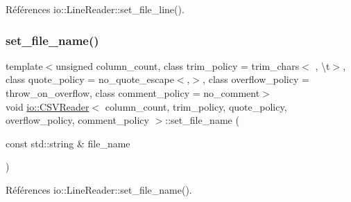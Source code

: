 Références io\+::\+Line\+Reader\+::set\+\_\+file\+\_\+line().

\mbox{\label{classio_1_1CSVReader_a4096c1e43a4fba2b4f5ae21d047b5fbc}} 
\subsubsection{\texorpdfstring{set\+\_\+file\+\_\+name()}{set\_file\_name()}\hspace{0.1cm}{\footnotesize\ttfamily [1/2]}}
{\footnotesize\ttfamily template$<$unsigned column\+\_\+count, class trim\+\_\+policy  = trim\+\_\+chars$<$\textquotesingle{} \textquotesingle{}, \textquotesingle{}\textbackslash{}t\textquotesingle{}$>$, class quote\+\_\+policy  = no\+\_\+quote\+\_\+escape$<$\textquotesingle{},\textquotesingle{}$>$, class overflow\+\_\+policy  = throw\+\_\+on\+\_\+overflow, class comment\+\_\+policy  = no\+\_\+comment$>$ \\
void \hyperlink{classio_1_1CSVReader}{io\+::\+C\+S\+V\+Reader}$<$ column\+\_\+count, trim\+\_\+policy, quote\+\_\+policy, overflow\+\_\+policy, comment\+\_\+policy $>$\+::set\+\_\+file\+\_\+name (\begin{DoxyParamCaption}\item[{const std\+::string \&}]{file\+\_\+name }\end{DoxyParamCaption})\hspace{0.3cm}{\ttfamily [inline]}}



Références io\+::\+Line\+Reader\+::set\+\_\+file\+\_\+name().

\mbox{\label{classio_1_1CSVReader_a5f1dc083a8fa8661f5ecdcf6aebc7b24}} 
